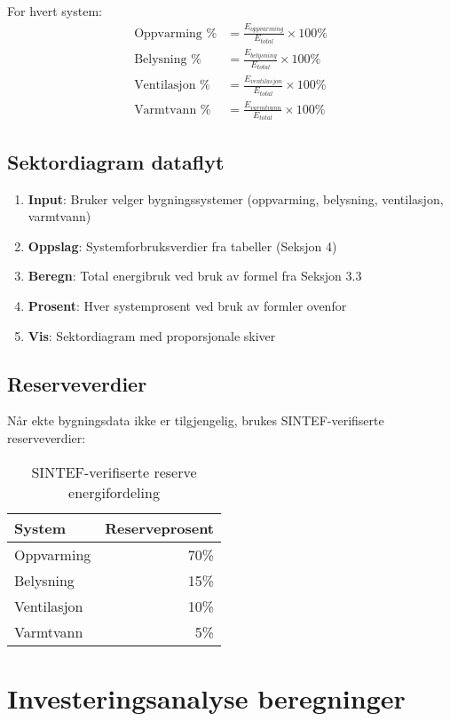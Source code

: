 \documentclass[12pt,a4paper]{article}
\begin{document}
For hvert system:
\begin{align}
\text{Oppvarming \%} &= \frac{E_{oppvarming}}{E_{total}} \times 100\% \\
\text{Belysning \%} &= \frac{E_{belysning}}{E_{total}} \times 100\% \\
\text{Ventilasjon \%} &= \frac{E_{ventilasjon}}{E_{total}} \times 100\% \\
\text{Varmtvann \%} &= \frac{E_{varmtvann}}{E_{total}} \times 100\%
\end{align}

\subsection{Sektordiagram dataflyt}

\begin{enumerate}
\item \textbf{Input}: Bruker velger bygningssystemer (oppvarming, belysning, ventilasjon, varmtvann)
\item \textbf{Oppslag}: Systemforbruksverdier fra tabeller (Seksjon 4)
\item \textbf{Beregn}: Total energibruk ved bruk av formel fra Seksjon 3.3
\item \textbf{Prosent}: Hver systemprosent ved bruk av formler ovenfor
\item \textbf{Vis}: Sektordiagram med proporsjonale skiver
\end{enumerate}

\subsection{Reserveverdier}

Når ekte bygningsdata ikke er tilgjengelig, brukes SINTEF-verifiserte reserveverdier:

\begin{table}[H]
\centering
\begin{tabular}{|l|r|}
\hline
\textbf{System} & \textbf{Reserveprosent} \\
\hline
Oppvarming & 70\% \\
Belysning & 15\% \\
Ventilasjon & 10\% \\
Varmtvann & 5\% \\
\hline
\end{tabular}
\caption{SINTEF-verifiserte reserve energifordeling}
\end{table}

\section{Investeringsanalyse beregninger}
\end{document}
